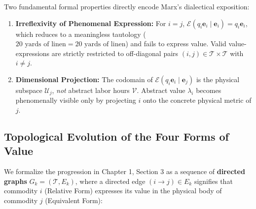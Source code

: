 \documentclass[11pt,a4paper]{article}
\begin{document}
Two fundamental formal properties directly encode Marx's dialectical exposition:
\begin{enumerate}[label=(\roman*)]
    \item \textbf{Irreflexivity of Phenomenal Expression:} For $i = j$, $\mathcal{E}(q_i \mathbf{e}_i \mid \mathbf{e}_i) = q_i \mathbf{e}_i$, which reduces to a meaningless tautology ($20\text{ yards of linen} = 20\text{ yards of linen}$) and fails to express value. Valid value-expressions are strictly restricted to off-diagonal pairs $(i,j) \in \mathcal{T} \times \mathcal{T}$ with $i \neq j$.
    \item \textbf{Dimensional Projection:} The codomain of $\mathcal{E}(q_i \mathbf{e}_i \mid \mathbf{e}_j)$ is the physical subspace $\mathcal{U}_j$, \textit{not} abstract labor hours $\mathcal{V}$. Abstract value $\lambda_i$ becomes phenomenally visible only by projecting $i$ onto the concrete physical metric of $j$.
\end{enumerate}

\subsection{Topological Evolution of the Four Forms of Value}

We formalize the progression in Chapter 1, Section 3 as a sequence of \textbf{directed graphs} $G_k = (\mathcal{T}, E_k)$, where a directed edge $(i \to j) \in E_k$ signifies that commodity $i$ (Relative Form) expresses its value in the physical body of commodity $j$ (Equivalent Form):
\end{document}
